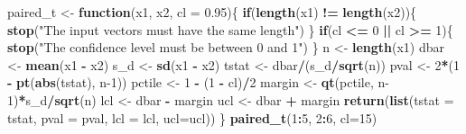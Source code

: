 \documentclass[
]{krantz}
\newenvironment{Shaded}{\begin{snugshade}}{\end{snugshade}}
\newcommand{\ControlFlowTok}[1]{\textcolor[rgb]{0.13,0.29,0.53}{\textbf{#1}}}
\newcommand{\DataTypeTok}[1]{\textcolor[rgb]{0.13,0.29,0.53}{#1}}
\newcommand{\DecValTok}[1]{\textcolor[rgb]{0.00,0.00,0.81}{#1}}
\newcommand{\FloatTok}[1]{\textcolor[rgb]{0.00,0.00,0.81}{#1}}
\newcommand{\KeywordTok}[1]{\textcolor[rgb]{0.13,0.29,0.53}{\textbf{#1}}}
\newcommand{\NormalTok}[1]{#1}
\newcommand{\OperatorTok}[1]{\textcolor[rgb]{0.81,0.36,0.00}{\textbf{#1}}}
\newcommand{\StringTok}[1]{\textcolor[rgb]{0.31,0.60,0.02}{#1}}
\begin{document}
\begin{Shaded}
\begin{Highlighting}[]
\NormalTok{paired\_t \textless{}{-}}\StringTok{ }\ControlFlowTok{function}\NormalTok{(x1, x2, }\DataTypeTok{cl =} \FloatTok{0.95}\NormalTok{)\{}
    \ControlFlowTok{if}\NormalTok{(}\KeywordTok{length}\NormalTok{(x1) }\OperatorTok{!=}\StringTok{ }\KeywordTok{length}\NormalTok{(x2))\{}
        \KeywordTok{stop}\NormalTok{(}\StringTok{"The input vectors  must have the same length"}\NormalTok{)}
\NormalTok{    \}}
    \ControlFlowTok{if}\NormalTok{(cl }\OperatorTok{\textless{}=}\StringTok{ }\DecValTok{0} \OperatorTok{||}\StringTok{ }\NormalTok{cl }\OperatorTok{\textgreater{}=}\StringTok{ }\DecValTok{1}\NormalTok{)\{}
        \KeywordTok{stop}\NormalTok{(}\StringTok{"The confidence level must be between 0 and 1"}\NormalTok{)}
\NormalTok{    \}}
\NormalTok{    n \textless{}{-}}\StringTok{ }\KeywordTok{length}\NormalTok{(x1)}
\NormalTok{    dbar \textless{}{-}}\StringTok{ }\KeywordTok{mean}\NormalTok{(x1 }\OperatorTok{{-}}\StringTok{ }\NormalTok{x2)}
\NormalTok{    s\_d \textless{}{-}}\StringTok{ }\KeywordTok{sd}\NormalTok{(x1 }\OperatorTok{{-}}\StringTok{ }\NormalTok{x2)}
\NormalTok{    tstat \textless{}{-}}\StringTok{ }\NormalTok{dbar}\OperatorTok{/}\NormalTok{(s\_d}\OperatorTok{/}\KeywordTok{sqrt}\NormalTok{(n))}
\NormalTok{    pval \textless{}{-}}\StringTok{ }\DecValTok{2}\OperatorTok{*}\NormalTok{(}\DecValTok{1} \OperatorTok{{-}}\StringTok{ }\KeywordTok{pt}\NormalTok{(}\KeywordTok{abs}\NormalTok{(tstat), n}\DecValTok{{-}1}\NormalTok{))}
\NormalTok{    pctile \textless{}{-}}\StringTok{ }\DecValTok{1} \OperatorTok{{-}}\StringTok{ }\NormalTok{(}\DecValTok{1} \OperatorTok{{-}}\StringTok{ }\NormalTok{cl)}\OperatorTok{/}\DecValTok{2}
\NormalTok{    margin \textless{}{-}}\StringTok{ }\KeywordTok{qt}\NormalTok{(pctile, n}\DecValTok{{-}1}\NormalTok{)}\OperatorTok{*}\NormalTok{s\_d}\OperatorTok{/}\KeywordTok{sqrt}\NormalTok{(n)}
\NormalTok{    lcl \textless{}{-}}\StringTok{ }\NormalTok{dbar }\OperatorTok{{-}}\StringTok{ }\NormalTok{margin}
\NormalTok{    ucl \textless{}{-}}\StringTok{ }\NormalTok{dbar }\OperatorTok{+}\StringTok{ }\NormalTok{margin}
    \KeywordTok{return}\NormalTok{(}\KeywordTok{list}\NormalTok{(}\DataTypeTok{tstat =}\NormalTok{ tstat, }\DataTypeTok{pval =}\NormalTok{ pval, }\DataTypeTok{lcl =}\NormalTok{ lcl, }\DataTypeTok{ucl=}\NormalTok{ucl))}
\NormalTok{\}}
\KeywordTok{paired\_t}\NormalTok{(}\DecValTok{1}\OperatorTok{:}\DecValTok{5}\NormalTok{, }\DecValTok{2}\OperatorTok{:}\DecValTok{6}\NormalTok{, }\DataTypeTok{cl=}\DecValTok{15}\NormalTok{)}
\end{Highlighting}
\end{Shaded}
\end{document}
